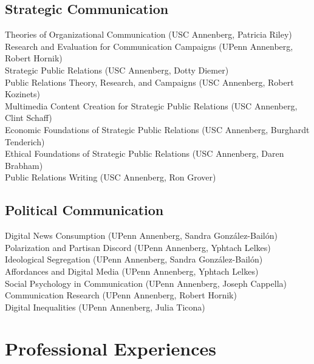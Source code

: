 \documentclass[12pt, letterpaper]{article}
\newcommand{\years}[1]{\marginnote{\normalsize #1}}
\begin{document}
{\subsection*{Strategic Communication}

  \years{} Theories of Organizational Communication (USC Annenberg, Patricia Riley)\\
  \years{} Research and Evaluation for Communication Campaigns (UPenn Annenberg, Robert Hornik)\\
  \years{} Strategic Public Relations (USC Annenberg, Dotty Diemer)\\
  \years{} Public Relations Theory, Research, and Campaigns (USC Annenberg, Robert Kozinets)\\
  \years{} Multimedia Content Creation for Strategic Public Relations (USC Annenberg, Clint Schaff)\\
  \years{} Economic Foundations of Strategic Public Relations (USC Annenberg, Burghardt Tenderich)\\
  \years{} Ethical Foundations of Strategic Public Relations (USC Annenberg, Daren Brabham)\\
  \years{} Public Relations Writing (USC Annenberg, Ron Grover)

\subsection*{Political Communication}

  \years{} Digital News Consumption (UPenn Annenberg, Sandra González-Bailón)\\
  \years{} Polarization and Partisan Discord (UPenn Annenberg, Yphtach Lelkes)\\
  \years{} Ideological Segregation (UPenn Annenberg, Sandra González-Bailón)\\
  \years{} Affordances and Digital Media (UPenn Annenberg, Yphtach Lelkes)\\
  \years{} Social Psychology in Communication (UPenn Annenberg, Joseph Cappella)\\
  \years{} Communication Research (UPenn Annenberg, Robert Hornik)\\
  \years{} Digital Inequalities (UPenn Annenberg, Julia Ticona)


\section*{Professional Experiences}

}
\end{document}
